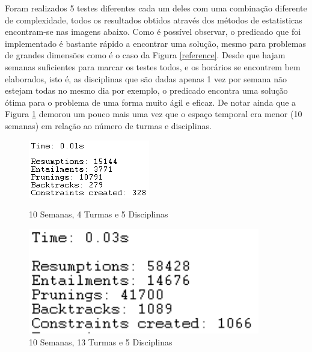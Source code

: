 \documentclass{llncs}
\begin{document}
Foram realizados 5 testes diferentes cada um deles com uma combinação diferente de complexidade, todos os resultados obtidos através dos métodos de estatisticas encontram-se nas imagens abaixo. Como é possível observar, o predicado que foi implementado é bastante rápido a encontrar uma solução, mesmo para problemas de grandes dimensões como é o caso da Figura \ref{reference}. Desde que hajam semanas suficientes para marcar os testes todos, e os horários se encontrem bem elaborados, isto é, as disciplinas que são dadas apenas 1 vez por semana não estejam todas no mesmo dia por exemplo, o predicado encontra uma solução ótima para o problema de uma forma muito ágil e eficaz. De notar ainda que a Figura \ref{refme} demorou um pouco mais uma vez que o espaço temporal era menor (10 semanas) em relação ao número de turmas e disciplinas.
\begin{figure}
\centering
    \begin{minipage}{0.45\textwidth}
    \centering
    \includegraphics[width=.9\textwidth]{10Semanas_4Turmas_5Disciplinas}
    \caption{10 Semanas, 4 Turmas e 5 Disciplinas}
    \end{minipage}\hfill
    \begin{minipage}{0.45\textwidth}
    \centering
    \includegraphics[width=0.9\textwidth]{10Semanas_13Turmas_5Disciplinas}
    \caption{10 Semanas, 13 Turmas e 5 Disciplinas}
    \label{refme}
    \end{minipage}\hfill
\end{figure}
\FloatBarrier
\end{document}
